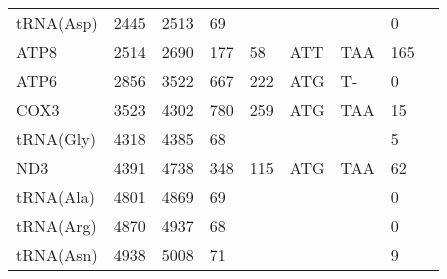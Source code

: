 \documentclass[../DISSERTACAO_MAIN.tex]{subfiles}
\begin{document}
\begin{longtable}{llllllllllllllllllllll}
			tRNA(Asp)    & \multicolumn{2}{l}{2445}    & \multicolumn{2}{l}{2513}    & \multicolumn{2}{l}{69}          & \multicolumn{3}{l}{}                          & \multicolumn{3}{l}{}      & \multicolumn{3}{l}{}        & \multicolumn{3}{l}{0}           & \multicolumn{3}{l}{}         \\
			ATP8         & \multicolumn{2}{l}{2514}    & \multicolumn{2}{l}{2690}    & \multicolumn{2}{l}{177}         & \multicolumn{3}{l}{58}                        & \multicolumn{3}{l}{ATT}   & \multicolumn{3}{l}{TAA}     & \multicolumn{3}{l}{165}         & \multicolumn{3}{l}{}         \\
			ATP6         & \multicolumn{2}{l}{2856}    & \multicolumn{2}{l}{3522}    & \multicolumn{2}{l}{667}         & \multicolumn{3}{l}{222}                       & \multicolumn{3}{l}{ATG}   & \multicolumn{3}{l}{T-}      & \multicolumn{3}{l}{0}           & \multicolumn{3}{l}{}         \\
			COX3         & \multicolumn{2}{l}{3523}    & \multicolumn{2}{l}{4302}    & \multicolumn{2}{l}{780}         & \multicolumn{3}{l}{259}                       & \multicolumn{3}{l}{ATG}   & \multicolumn{3}{l}{TAA}     & \multicolumn{3}{l}{15}          & \multicolumn{3}{l}{}         \\
			tRNA(Gly)    & \multicolumn{2}{l}{4318}    & \multicolumn{2}{l}{4385}    & \multicolumn{2}{l}{68}          & \multicolumn{3}{l}{}                          & \multicolumn{3}{l}{}      & \multicolumn{3}{l}{}        & \multicolumn{3}{l}{5}           & \multicolumn{3}{l}{}         \\
			ND3          & \multicolumn{2}{l}{4391}    & \multicolumn{2}{l}{4738}    & \multicolumn{2}{l}{348}         & \multicolumn{3}{l}{115}                       & \multicolumn{3}{l}{ATG}   & \multicolumn{3}{l}{TAA}     & \multicolumn{3}{l}{62}          & \multicolumn{3}{l}{}         \\
			tRNA(Ala)    & \multicolumn{2}{l}{4801}    & \multicolumn{2}{l}{4869}    & \multicolumn{2}{l}{69}          & \multicolumn{3}{l}{}                          & \multicolumn{3}{l}{}      & \multicolumn{3}{l}{}        & \multicolumn{3}{l}{0}           & \multicolumn{3}{l}{}         \\
			tRNA(Arg)    & \multicolumn{2}{l}{4870}    & \multicolumn{2}{l}{4937}    & \multicolumn{2}{l}{68}          & \multicolumn{3}{l}{}                          & \multicolumn{3}{l}{}      & \multicolumn{3}{l}{}        & \multicolumn{3}{l}{0}           & \multicolumn{3}{l}{}         \\
			tRNA(Asn)    & \multicolumn{2}{l}{4938}    & \multicolumn{2}{l}{5008}    & \multicolumn{2}{l}{71}          & \multicolumn{3}{l}{}                          & \multicolumn{3}{l}{}      & \multicolumn{3}{l}{}        & \multicolumn{3}{l}{9}           & \multicolumn{3}{l}{}         \\

\end{longtable}
\end{document}

